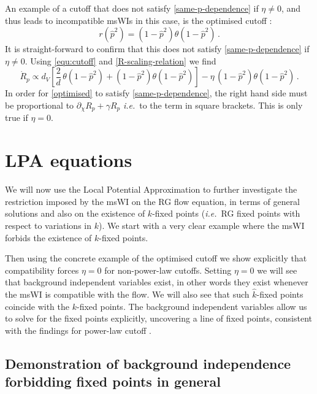 \documentclass[11pt]{book} %
\newcommand\ie{\textit{i.e.}\ }
\newcommand{\be}{\begin{equation}}
\newcommand{\ee}{\end{equation}}
\begin{document}
An example of a cutoff that does not satisfy \eqref{same-p-dependence} if $\eta\ne0$, and thus leads to incompatible msWIs in this case, is the optimised cutoff \cite{Litim:2000ci, Litim:2001fd}:
\be
\label{optimised}
r(\hat{p}^2) = (1-\hat{p}^2)\theta(1-\hat{p}^2)\,.
\ee
It is straight-forward to confirm that this does not satisfy \eqref{same-p-dependence} if $\eta\ne0$. Using \eqref{equ:cutoff} and \eqref{R-scaling-relation} we find
\be
\dot{R}_p \propto d_V \left[ \frac{2}{d}\,\theta(1-\hat{p}^2) + (1-\hat{p}^2)\theta(1-\hat{p}^2)\right] - \eta\, (1-\hat{p}^2)\theta(1-\hat{p}^2)\,.
\ee
In order for \eqref{optimised} to satisfy \eqref{same-p-dependence}, the right hand side must be proportional to $\partial_\chi R_p+\gamma R_p$ \ie to the term in square brackets. This is only true if $\eta=0$.


\section{LPA equations}

We will now use the Local Potential Approximation to further investigate the restriction imposed by the msWI on the RG flow equation, in terms of general solutions and also on the existence of $k$-fixed points (\ie RG fixed points with respect to variations in $k$). We start with a very clear example where the msWI forbids the existence of $k$-fixed points.

Then using the concrete example of the optimised cutoff we show explicitly that compatibility forces $\eta=0$ for non-power-law cutoffs. Setting $\eta=0$ we will see that background independent variables exist, in other words they exist whenever the msWI is compatible with the flow. We will also see that such $\hat{k}$-fixed points coincide with the $k$-fixed points. The background independent variables allow us to solve for the fixed points explicitly, uncovering a line of fixed points, consistent with the findings for power-law cutoff \cite{Dietz:2016gzg}.

\subsection{Demonstration of background independence forbidding fixed points in general}\label{sec:forbids}
\end{document}
